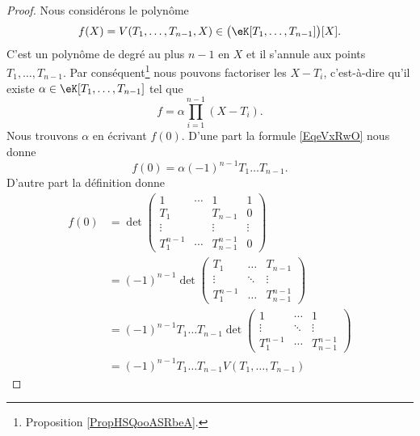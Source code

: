 \begin{proof}
	Nous considérons le polynôme
	\begin{equation}
		f(X)=V(T_1,\ldots, T_{n-1},X)\in \big( \eK[T_1,\ldots, T_{n-1}] \big)[X].
	\end{equation}
	C'est un polynôme de degré au plus \( n-1\) en \( X\) et il s'annule aux points \( T_1,\ldots, T_{n-1}\). Par conséquent\footnote{Proposition \ref{PropHSQooASRbeA}.} nous pouvons factoriser les \( X-T_i\), c'est-à-dire qu'il existe \( \alpha\in \eK[T_1,\ldots, T_{n-1}]\) tel que
	\begin{equation}    \label{EqeVxRwO}
		f=\alpha\prod_{i=1}^{n-1}(X-T_i).
	\end{equation}
	Nous trouvons \( \alpha\) en écrivant \( f(0)\). D'une part la formule \eqref{EqeVxRwO} nous donne
	\begin{equation}    \label{EqblwWMj}
		f(0)=\alpha(-1)^{n-1}T_1\ldots T_{n-1}.
	\end{equation}
	D'autre part la définition donne
	\begin{subequations}
		\begin{align}
			f(0) & =\det\begin{pmatrix}
				1         & \cdots & 1             & 1      \\
				T_1       &        & T_{n-1}       & 0      \\
				\vdots    &        & \vdots        & \vdots \\
				T_1^{n-1} & \cdots & T_{n-1}^{n-1} & 0
			\end{pmatrix}                            \\
			     & =(-1)^{n-1}\det\begin{pmatrix}
				T_1       & \ldots & T_{n-1}       \\
				\vdots    & \ddots & \vdots        \\
				T_1^{n-1} & \ldots & T_{n-1}^{n-1}
			\end{pmatrix}                  \\
			     & =(-1)^{n-1}T_1\ldots T_{n-1}\det\begin{pmatrix}
				1         & \cdots & 1             \\
				\vdots    & \ddots & \vdots        \\
				T_1^{n-1} & \cdots & T_{n-1}^{n-1}
			\end{pmatrix} \\
			     & =(-1)^{n-1}T_1\ldots T_{n-1}V(T_1,\ldots, T_{n-1})
		\end{align}
	\end{subequations}

\end{proof}
